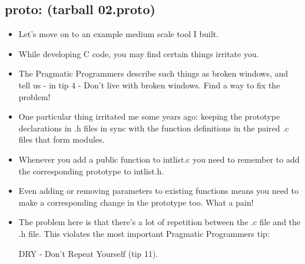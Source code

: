\documentclass[handout,]{beamer}
\newcommand{\pitem}{\pause \item}
\begin{document}
\subsection{proto: (tarball 02.proto)}

\begin{frame}[fragile]
    \begin{itemize}
      \item
      Let's move on to an example medium scale tool I built.

    \item
      While developing C code, you may find certain things
      irritate you.

    \item
      The Pragmatic Programmers describe such things as \alert{broken windows},
      and tell us - in tip 4 - \alert{Don't live with broken windows}.
      Find a way to fix the problem!
  
    \pitem
      One particular thing irritated me some years ago:
      keeping the \alert{prototype declarations} in
      .h files in sync with the \alert{function definitions}
      in the paired .c files that form modules.

    \pitem
      Whenever you \alert{add a public function} to \alert{intlist.c}
      you need to remember to add the corresponding prototype to
      \alert{intlist.h}.

    \pitem
      Even \alert{adding or removing parameters} to existing functions
      means you need to make a corresponding change
      in the prototype too.
      \pause
      What a pain!

    \pitem
      The problem here is that there's a lot of repetition between
      the .c file and the .h file.
      This violates the most important Pragmatic Programmers tip:
      
      \alert{DRY - Don't Repeat Yourself} (tip 11).

    \end{itemize}
\end{frame}
\end{document}
